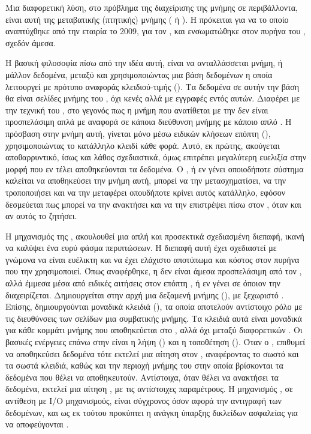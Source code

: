 Μια διαφορετική λύση, στο πρόβλημα της διαχείρισης της μνήμης σε
 περιβάλλοντα, είναι αυτή της μεταβατικής (πτητικής) μνήμης
( ή ). Η  πρόκειται για να 
το οποίο αναπτύχθηκε από την εταιρία  το 2009, για
τον , και ενσωματώθηκε στον πυρήνα του , σχεδόν άμεσα\cite{tmemXenSummit}.
\newline

Η βασική φιλοσοφία πίσω από την ιδέα αυτή, είναι να ανταλλάσσεται
μνήμη, ή μάλλον δεδομένα, μεταξύ  και  χρησιμοποιώντας μια βάση
δεδομένων η οποία λειτουργεί με πρότυπο αναφοράς κλειδιού-τιμής
()\cite{Aimilios}. Τα δεδομένα σε αυτήν την βάση θα είναι
σελίδες μνήμης του , όχι κενές αλλά με εγγραφές εντός αυτών. Διαφέρει με την τεχνική του
, στο γεγονός πως η μνήμη που ανατίθεται με την 
δεν είναι προσπελάσιμη απλά με αναφορά σε κάποια διεύθυνση
μνήμης με κάποιο απλό . Η πρόσβαση στην μνήμη αυτή,
γίνεται μόνο μέσω ειδικών κλήσεων επόπτη (),
χρησιμοποιώντας το κατάλληλο κλειδί κάθε φορά. Αυτό, εκ πρώτης,
ακούγεται αποθαρρυντικό, ίσως και λάθος σχεδιαστικά, όμως επιτρέπει
μεγαλύτερη ευελιξία στην μορφή που εν τέλει αποθηκεύονται τα
δεδομένα. O , ή εν γένει οποιοδήποτε σύστημα καλείται να
αποθηκεύσει την μνήμη αυτή, μπορεί να την μετασχηματίσει, να
την τροποποιήσει και να την μεταφέρει οπουδήποτε κρίνει
αυτός κατάλληλο, εφόσον δεσμεύεται πως μπορεί να την ανακτήσει
και να την επιστρέψει πίσω στον , όταν και αν αυτός το ζητήσει\cite{tmemNutshell}.
\newline

Η μηχανισμός της , ακουλουθεί μια απλή και προσεκτικά
σχεδιασμένη διεπαφή, ικανή να καλύψει ένα ευρύ φάσμα
περιπτώσεων. Η διεπαφή αυτή έχει σχεδιαστεί με γνώμονα να
είναι ευέλικτη και να έχει ελάχιστο αποτύπωμα και κόστος
στον πυρήνα που την χρησιμοποιεί. Όπως αναφέρθηκε, η 
δεν είναι άμεσα προσπελάσιμη από τον , αλλά έμμεσα μέσα
από ειδικές αιτήσεις στον επόπτη , ή εν γένει σε όποιον την
διαχειρίζεται. Δημιουργείται στην αρχή μια δεξαμενή μνήμης
(), με ξεχωριστό . Επίσης, δημιουργούνται μοναδικά
κλειδιά (), τα οποία αποτελούν αντίστοιχο ρόλο με τις
διευθύνσεις των σελίδων μια συμβατικής μνήμης. Τα κλειδιά αυτά
είναι μοναδικά για κάθε κομμάτι μνήμης που αποθηκεύεται στο
, αλλά όχι μεταξύ διαφορετικών . Οι βασικές ενέργειες
επάνω στην  είναι η λήψη () και η τοποθέτηση ().
Όταν ο , επιθυμεί να αποθηκεύσει δεδομένα τότε εκτελεί μια
αίτηση  στον , αναφέροντας το σωστό  και
τα σωστά κλειδιά, καθώς και την περιοχή μνήμης του στην οποία βρίσκονται
τα δεδομένα που θέλει να αποθηκευτούν\cite{tmemXenSummit}. Αντίστοιχα, όταν
θέλει να ανακτήσει τα δεδομένα, εκτελεί μια αίτηση , με
τις αντίστοιχες παραμέτρους. Η μηχανισμός , σε αντίθεση
με I/O μηχανισμούς, είναι σύγχρονος όσον αφορά την αντιγραφή
των δεδομένων, και ως εκ τούτου προκύπτει η ανάγκη ύπαρξης
δικλείδων ασφαλείας για να αποφεύγονται \cite{tmemNutshell}.
\newline

